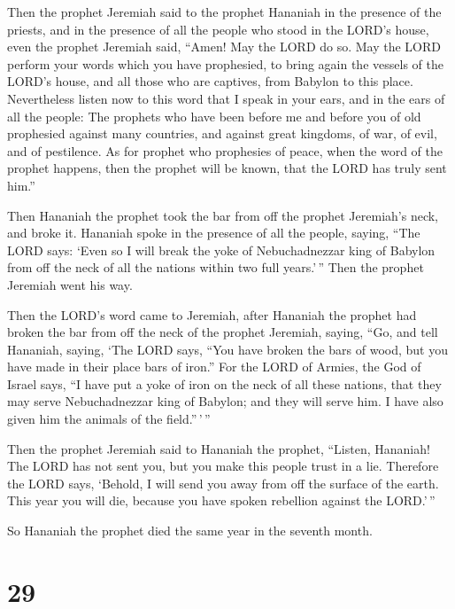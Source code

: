  Then the prophet Jeremiah said to the prophet Hananiah in
the presence of the priests, and in the presence of all the people who
stood in the LORD's house,  even the prophet Jeremiah said,
``Amen! May the LORD do so. May the LORD perform your words which you
have prophesied, to bring again the vessels of the LORD's house, and all
those who are captives, from Babylon to this place. 
Nevertheless listen now to this word that I speak in your ears, and in
the ears of all the people:  The prophets who have been
before me and before you of old prophesied against many countries, and
against great kingdoms, of war, of evil, and of pestilence. 
As for prophet who prophesies of peace, when the word of the prophet
happens, then the prophet will be known, that the LORD has truly sent
him.''

 Then Hananiah the prophet took the bar from off the
prophet Jeremiah's neck, and broke it.  Hananiah spoke in
the presence of all the people, saying, ``The LORD says: `Even so I will
break the yoke of Nebuchadnezzar king of Babylon from off the neck of
all the nations within two full years.'\,'' Then the prophet Jeremiah
went his way.

 Then the LORD's word came to Jeremiah, after Hananiah the
prophet had broken the bar from off the neck of the prophet Jeremiah,
saying,  ``Go, and tell Hananiah, saying, `The LORD says,
``You have broken the bars of wood, but you have made in their place
bars of iron.''  For the LORD of Armies, the God of Israel
says, ``I have put a yoke of iron on the neck of all these nations, that
they may serve Nebuchadnezzar king of Babylon; and they will serve him.
I have also given him the animals of the field.''\,'\,''

 Then the prophet Jeremiah said to Hananiah the prophet,
``Listen, Hananiah! The LORD has not sent you, but you make this people
trust in a lie.  Therefore the LORD says, `Behold, I will
send you away from off the surface of the earth. This year you will die,
because you have spoken rebellion against the LORD.'\,''

 So Hananiah the prophet died the same year in the seventh
month.

\hypertarget{section-28}{%
\section{29}\label{section-28}}

